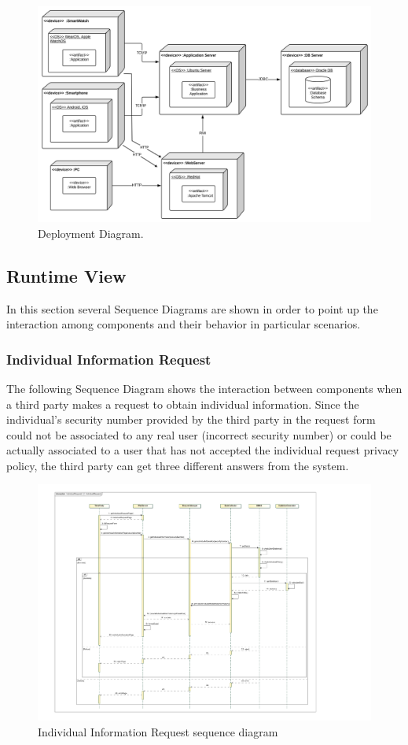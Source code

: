 \begin{figure}[H]
\centering
\includegraphics[scale=0.12]{Images/DeploymentDiagram.png}
\caption{Deployment Diagram.}
\end{figure}
\newpage

\subsection{Runtime View}
In this section several Sequence Diagrams are shown in order to point up the interaction among components and their behavior in particular scenarios.
\subsubsection{Individual Information Request}
The following Sequence Diagram shows the interaction between components when a third party makes a request to obtain individual information. Since the individual's security number provided by the third party in the request form could not be associated to any real user (incorrect security number) or could be actually associated to a user that has not accepted the individual request privacy policy, the third party can get three different answers from the system.
\\[1.0cm]
\begin{figure}[H]
\centering
\includegraphics[scale=0.8, angle=0,origin=c]{Images/SequenceDiagrams/IndividualRequest.pdf}
\caption{Individual Information Request sequence diagram}
\clearpage
\end{figure}
\newpage

